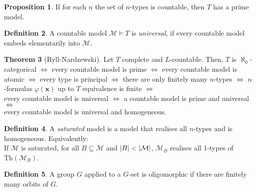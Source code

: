 \documentclass[a4paper,10pt]{article}
\theoremstyle{definition}
\newtheorem{theorem}{Theorem}
\DeclarePairedDelimiter\abs{\lvert}{\rvert}
\newtheorem{definition}[theorem]{Definition}
\newtheorem{proposition}[theorem]{Proposition}
\let\vec\mathbf
\let\phi\varphi
\begin{document}
\begin{proposition}
    If for each $n$ the set of $n$-types is countable, then $T$ has a prime model.
\end{proposition}

\begin{definition}
    A countable model $\mathcal{M} \models T$ is \emph{universal}, if every countable model embeds elementarily into $\mathcal{M}$.
\end{definition}

\begin{theorem}[Ryll-Nardzewski]
    Let $T$ complete and $L$-countable. Then, $T$ is $\aleph_0$-categorical $\iff$ every countable model is prime $\iff$ every countable model is atomic $\iff$ every type is principal $\iff$ there are only finitely many $n$-types $\iff$ $n$-formulas $\phi(\vec{x})$ up to $T$ equivalence is finite $\iff$ \\every countable model is universal $\iff$ a countable model is prime and universal $\iff$ \\ every countable model is universal and homogeneous.
\end{theorem}

\begin{definition}
    A \emph{saturated} model is a model that realises all $n$-types and is homogeneous. Equivalently: \\
    If $\mathcal{M}$ is saturated, for all $B \subseteq \mathcal{M}$ and $\abs{B} < \abs{\mathcal{M}}$, $\mathcal{M}_B$ realises all 1-types of $\mathrm{Th}(\mathcal{M}_B)$.
\end{definition}

\begin{definition}
    A group $G$ applied to a $G$-set is oligomorphic if there are finitely many orbits of $G$.
\end{definition}
\end{document}
